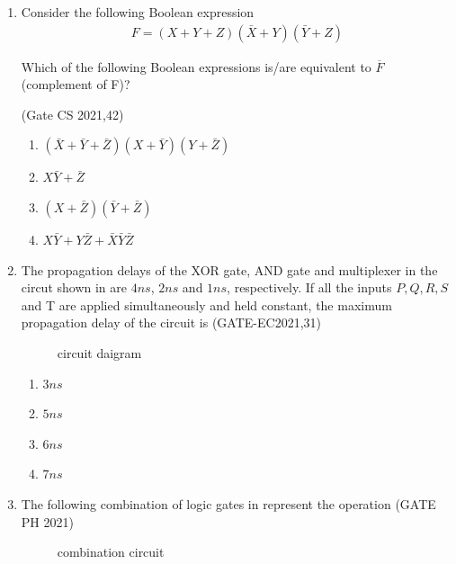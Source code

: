 \begin{enumerate}[label=\arabic*.,ref=\theenumi]
\item Consider the following Boolean expression 
\begin{align*} F = (X+Y+Z)(\bar{X}+Y)(\bar{Y}+Z) \end{align*}
       
Which of the following Boolean expressions is/are equivalent to $\overline{F}$ (complement of 
 F)?
 
\hfill{(Gate CS 2021,42)}
\begin{enumerate}                                     
\item $(\bar{X}+\bar{Y}+\bar{Z})(X+\bar{Y})(Y+\bar{Z})$
\item $X\bar{Y}+\bar{Z}$
\item $(X+\bar{Z})(\bar{Y}+\bar{Z})$
\item $X\bar{Y}+Y\bar{Z}+\bar{X}\bar{Y}\bar{Z}$ 
\end{enumerate}

    \item The propagation delays of the XOR gate, AND gate and multiplexer  in the circut shown in  
	    are $4 ns$, $2 ns$ and $1 ns$, respectively.
    If all the inputs $P, Q, R, S$ and T are applied simultaneously and held constant, the maximum propagation delay of the circuit is
\hfill(GATE-EC2021,31)  

\begin{figure}[!ht]
	\resizebox{\columnwidth}{!}{

	}
\caption{circuit daigram} 
\label{fig:block_diagram}
\end{figure}
\begin{enumerate}

    \item $3 ns$
    \item $5 ns$
    \item $6 ns$
    \item $7 ns$
\end{enumerate}
\item  The following combination of logic gates
in
	represent the operation
 \hfill(GATE PH 2021)
	      \begin{figure}[!ht]
		      \centering
		      \resizebox{\columnwidth}{!}{%
		      
		      }
	              \caption{combination circuit}
		      \label{fig:GATE PH 2021}
	      \end{figure}


\end{enumerate}
